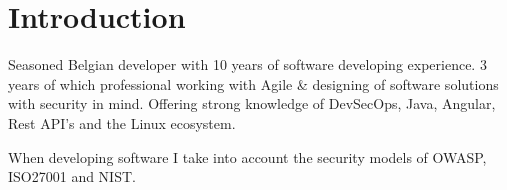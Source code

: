 \section{Introduct\textcolor{mycolor}{ion}}
\begin{center}
  Seasoned \textcolor{mycolor}{Belgian} developer with \textcolor{mycolor}{10 years} of software developing experience.
  3 years of which professional working with Agile \& designing of software solutions with \textcolor{mycolor}{security} in mind. 
  Offering strong knowledge of \textcolor{mycolor}{DevSecOps, Java, Angular, Rest API's and the Linux ecosystem}.
  
  When developing software I take into account the security models of \textcolor{mycolor}{OWASP, ISO27001 and NIST}.
\end{center}

